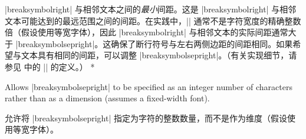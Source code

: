 \begin{optionlist}
\begin{paracol}{2}
\switchcolumn
\item[breaksymbolsepright (维度) (\meta{breaksymbolseprightnchars})]
|breaksymbolright| 与相邻文本之间的\emph{最小}间距。这是 |breaksymbolright| 与相邻文本可能达到的最远范围之间的间距。在实践中，|\linewidth| 通常不是字符宽度的精确整数倍（假设使用等宽字体），因此 |breaksymbolright| 与相邻文本的实际间距通常大于 |breaksymbolsepright|。这确保了断行符号与左右两侧边距的间距相同。如果希望与文本具有相同的间距，可以调整 |breaksymbolsepright|。（有关实现细节，请参见  中的 |\FV@makeLineNumber| 的定义。）
\switchcolumn[0]*%
\item[breaksymbolseprightnchars (integer) (2)]
Allows |breaksymbolsepright| to be specified as an integer number of characters rather than as a dimension (assumes a fixed-width font).
\switchcolumn
\item[breaksymbolseprightnchars (整数) (2)]
允许将 |breaksymbolsepright| 指定为字符的整数数量，而不是作为维度（假设使用等宽字体）。
\end{paracol}
\end{optionlist}
